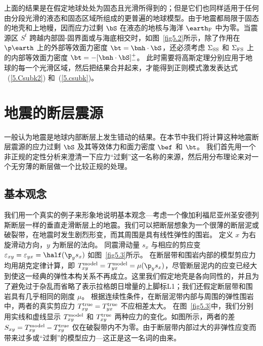 上面的结果是在假定地球处处为固态且光滑所得到的；但是它们也同样适用于任何由分段光滑的液态和固态区域所组成的更普遍的地球模型。由于地震都局限于固态的地壳和上地幔，因而应力过剩
$\bS$ 在液态的地核与海洋 $\earth_{\rm F}$ 中为零。当震源区 $S^t$ 跨越内部固-固界面或与海底相交时，如图~\ref{fig5.2}所示，除了作用在 $\p\earth$ 上的外部等效面力密度
$\bt=\bnh\cdot\bS$，还必须考虑 $\Sigma_{\rm SS}$ 和 $\Sigma_{\rm FS}$
上的内部等效面力密度
$\bt=-[\bnh\cdot\bS]^+_-$。
此时需要将高斯定理分别应用于地球的每一个光滑区域，然后把结果合并起来，才能得到正则模式激发表达式
~(\ref{5.Csubk2}) 和~(\ref{5.csubk})。
%

\section{地震的断层震源}
\label{5.sec.fault}

一般认为地震是地球内部断层上发生错动的结果。在本节中我们将计算这种地震断层震源的应力过剩 $\bS$ 及其等效体力和面力密度 $\bef$ 和 $\bt$。
我们首先用一个非正规的定性分析来澄清一下应力“过剩”这一名称的来源，然后用分布理论来对一个无穷薄的断层做一个比较正规的处理。

\subsection{基本观念}

我们用一个真实的例子来形象地说明基本观念---考虑一个像加利福尼亚州圣安德列斯断层一样的垂直走滑断层上的地震。我们可以把断层想象为一个很薄的断层泥或破裂带，在地震时发生剧烈形变，而其周围是具有线性弹性的围岩。
定义 $x$ 为右旋滑动方向，$y$ 为断层的法向。
同震滑动量
%
%
$s_x$ 与相应的剪应变 $\varepsilon_{xy}=\varepsilon_{yx}=\half(\p_y s_x)$
如图~\ref{fig5.3}所示。
在断层带和围岩内部的模型剪应力均用胡克定律计算，即
$T^{\rm model}_{xy}=T^{\rm model}_{yx}=\mu(\p_y s_x)$，尽管断层泥内的应变已经大到使这一经典的弹性本构关系不再成立。这里我们假定地壳是各向同性的，并且为了避免过于杂乱而省略了表示拉格朗日增量的上脚标L1；我们还假定断层带和围岩具有几乎相同的刚度 $\mu$。
根据连续性条件，在断层泥带内部与周围的弹性围岩中，两者的真实剪应力 $T^{\rm true}_{xy}=T^{\rm true}_{yx}$ 不应相差太大。
在图~\ref{fig5.3}中，我们分别用实线和虚线显示
$T^{\rm model}_{xy}$ 和 $T^{\rm true}_{xy}$
两种应力的变化。如图所示，两者的差
$S_{xy}=T^{\rm model}_{xy}-T^{\rm true}_{xy}$
仅在破裂带内不为零。由于断层带内部过大的非弹性应变而带来过多或“过剩”的模型应力---这正是这一名词的由来。

